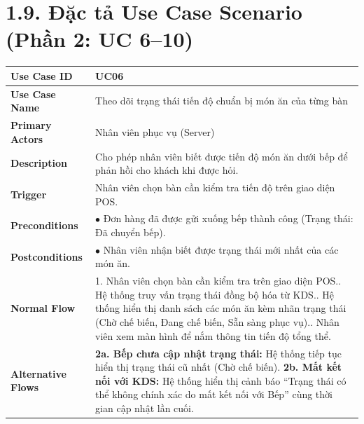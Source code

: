 \section*{1.9. Đặc tả Use Case Scenario (Phần 2: UC 6--10)}

\begin{longtable}{|L{3.5cm}|L{12.5cm}|}
\hline
\textbf{Use Case ID} & UC06 \\ \hline
\textbf{Use Case Name} & Theo dõi trạng thái tiến độ chuẩn bị món ăn của từng bàn \\ \hline
\textbf{Primary Actors} & Nhân viên phục vụ (Server) \\ \hline
\textbf{Description} & Cho phép nhân viên biết được tiến độ món ăn dưới bếp để phản hồi cho khách khi được hỏi. \\ \hline
\textbf{Trigger} & Nhân viên chọn bàn cần kiểm tra tiến độ trên giao diện POS. \\ \hline
\textbf{Preconditions} & $\bullet$ Đơn hàng đã được gửi xuống bếp thành công (Trạng thái: Đã chuyển bếp). \\ \hline
\textbf{Postconditions} & $\bullet$ Nhân viên nhận biết được trạng thái mới nhất của các món ăn. \\ \hline
\textbf{Normal Flow} &
1. Nhân viên chọn bàn cần kiểm tra trên giao diện POS.. Hệ thống truy vấn trạng thái đồng bộ hóa từ KDS.. Hệ thống hiển thị danh sách các món ăn kèm nhãn trạng thái (Chờ chế biến, Đang chế biến, Sẵn sàng phục vụ).. Nhân viên xem màn hình để nắm thông tin tiến độ tổng thể. \\ \hline
\textbf{Alternative Flows} &
\textbf{2a. Bếp chưa cập nhật trạng thái:} Hệ thống tiếp tục hiển thị trạng thái cũ nhất (Chờ chế biến).\newline
\textbf{2b. Mất kết nối với KDS:} Hệ thống hiển thị cảnh báo ``Trạng thái có thể không chính xác do mất kết nối với Bếp'' cùng thời gian cập nhật lần cuối. \\ \hline
\end{longtable}

